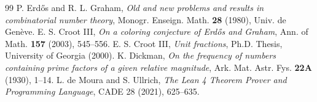 \documentclass[11pt,a4paper]{article}
\theoremstyle{definition}
\begin{document}
\begin{thebibliography}{99}
 P. Erd\H{o}s and R. L. Graham, \textit{Old and new problems and results in combinatorial number theory}, Monogr. Enseign. Math. \textbf{28} (1980), Univ. de Gen\`eve.
 E. S. Croot III, \textit{On a coloring conjecture of Erd\H{o}s and Graham}, Ann. of Math. \textbf{157} (2003), 545--556.
 E. S. Croot III, \textit{Unit fractions}, Ph.D. Thesis, University of Georgia (2000).
 K. Dickman, \textit{On the frequency of numbers containing prime factors of a given relative magnitude}, Ark. Mat. Astr. Fys. \textbf{22A} (1930), 1--14.
 L. de Moura and S. Ullrich, \textit{The Lean 4 Theorem Prover and Programming Language}, CADE 28 (2021), 625--635.
\end{thebibliography}
\end{document}
